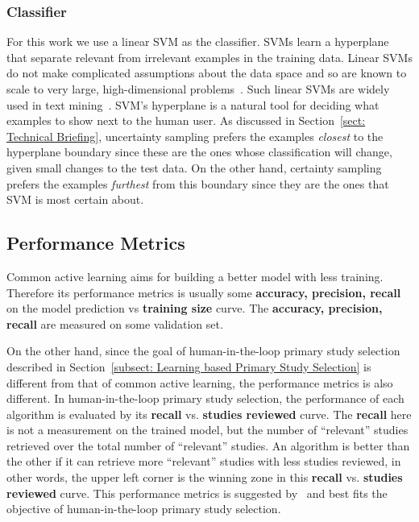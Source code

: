 \documentclass{svjour3}
\theoremstyle{break}
\begin{document}
\subsubsection{Classifier}

For this work we use a
linear SVM as the classifier.
SVMs learn a hyperplane that separate relevant from irrelevant examples
in the training data.
Linear SVMs do not make complicated assumptions about the data space
and so are known to scale to very large, high-dimensional
problems~\cite{joachims2006training}. Such linear SVMs are widely used in text
mining~\cite{krishna2016bigse}.
SVM's hyperplane is a natural tool for deciding what examples
to show next to the human user. As discussed in Section~\ref{sect: Technical Briefing}, uncertainty sampling prefers the examples
{\em closest} to the hyperplane boundary since these are the ones whose classification will
change, given small changes to the test data.
On the other hand, certainty sampling prefers
the examples {\em furthest} from this boundary since they are the ones that SVM is most certain about. 




\subsection{Performance Metrics}
\label{subsect: Performance Metrics}

Common active learning aims for building a better model with less training. Therefore its performance metrics is usually some \textbf{accuracy, precision, recall} on the model prediction vs \textbf{training size} curve. The \textbf{accuracy, precision, recall} are measured on some validation set.

On the other hand, since the goal of human-in-the-loop primary study selection described in Section~\ref{subsect: Learning based Primary Study Selection} is different from that of common active learning, the performance metrics is also different. In human-in-the-loop primary study selection, the performance of each algorithm is evaluated by its \textbf{recall} vs. \textbf{studies reviewed} curve. The \textbf{recall} here is not a measurement on the trained model, but the number of ``relevant'' studies retrieved over the total number of ``relevant'' studies. An algorithm is better than the other if it can retrieve more ``relevant'' studies with less studies reviewed, in other words, the upper left corner is the winning zone in this \textbf{recall} vs. \textbf{studies reviewed} curve. This performance metrics is suggested by~\cite{cormack2015autonomy,cormack2014evaluation,tredennick2015} and best fits the objective of human-in-the-loop primary study selection.
\end{document}
